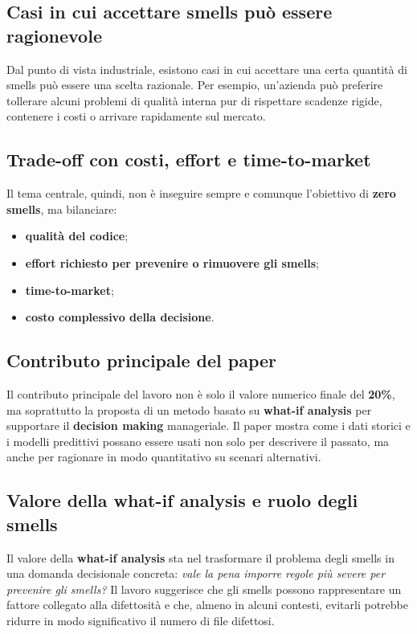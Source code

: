\subsection{Casi in cui accettare smells può essere ragionevole}

Dal punto di vista industriale, esistono casi in cui accettare una certa quantità di smells può essere una scelta razionale. Per esempio, un'azienda può preferire tollerare alcuni problemi di qualità interna pur di rispettare scadenze rigide, contenere i costi o arrivare rapidamente sul mercato.

\subsection{Trade-off con costi, effort e time-to-market}

Il tema centrale, quindi, non è inseguire sempre e comunque l'obiettivo di \textbf{zero smells}, ma bilanciare:

\begin{itemize}
    \item \textbf{qualità del codice};
    \item \textbf{effort richiesto per prevenire o rimuovere gli smells};
    \item \textbf{time-to-market};
    \item \textbf{costo complessivo della decisione}.
\end{itemize}

\subsection{Contributo principale del paper}

Il contributo principale del lavoro non è solo il valore numerico finale del \textbf{20\%}, ma soprattutto la proposta di un metodo basato su \textbf{what-if analysis} per supportare il \textbf{decision making} manageriale. Il paper mostra come i dati storici e i modelli predittivi possano essere usati non solo per descrivere il passato, ma anche per ragionare in modo quantitativo su scenari alternativi.

\subsection{Valore della what-if analysis e ruolo degli smells}

Il valore della \textbf{what-if analysis} sta nel trasformare il problema degli smells in una domanda decisionale concreta: \emph{vale la pena imporre regole più severe per prevenire gli smells?} Il lavoro suggerisce che gli smells possono rappresentare un fattore collegato alla difettosità e che, almeno in alcuni contesti, evitarli potrebbe ridurre in modo significativo il numero di file difettosi.

